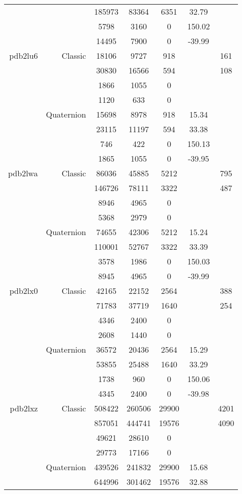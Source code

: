 \begin{xltabular}{\textwidth}{r|rcccSc}
& & 185973 & 83364 & 6351 & 32.79 & \\
& & 5798 & 3160 & 0 & 150.02 & \\
& & 14495 & 7900 & 0 & -39.99 & \\ \addlinespace
pdb2lu6 & Classic & 18106 & 9727 & 918 & & 161 \\
& & 30830 & 16566 & 594 & & 108 \\
& & 1866 & 1055 & 0 & & \\
& & 1120 & 633 & 0 & & \\
& Quaternion & 15698 & 8978 & 918 & 15.34 & \\
& & 23115 & 11197 & 594 & 33.38 & \\
& & 746 & 422 & 0 & 150.13 & \\
& & 1865 & 1055 & 0 & -39.95 & \\ \addlinespace
pdb2lwa & Classic & 86036 & 45885 & 5212 & & 795 \\
& & 146726 & 78111 & 3322 & & 487 \\
& & 8946 & 4965 & 0 & & \\
& & 5368 & 2979 & 0 & & \\
& Quaternion & 74655 & 42306 & 5212 & 15.24 & \\
& & 110001 & 52767 & 3322 & 33.39 & \\
& & 3578 & 1986 & 0 & 150.03 & \\
& & 8945 & 4965 & 0 & -39.99 & \\ \addlinespace
pdb2lx0 & Classic & 42165 & 22152 & 2564 & & 388 \\
& & 71783 & 37719 & 1640 & & 254 \\
& & 4346 & 2400 & 0 & & \\
& & 2608 & 1440 & 0 & & \\
& Quaternion & 36572 & 20436 & 2564 & 15.29 & \\
& & 53855 & 25488 & 1640 & 33.29 & \\
& & 1738 & 960 & 0 & 150.06 & \\
& & 4345 & 2400 & 0 & -39.98 & \\ \addlinespace
pdb2lxz & Classic & 508422 & 260506 & 29900 & & 4201 \\
& & 857051 & 444741 & 19576 & & 4090 \\
& & 49621 & 28610 & 0 & & \\
& & 29773 & 17166 & 0 & & \\
& Quaternion & 439526 & 241832 & 29900 & 15.68 & \\
& & 644996 & 301462 & 19576 & 32.88 & \\

\end{xltabular}
